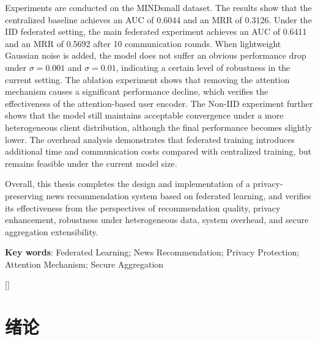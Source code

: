 \documentclass[UTF8,a4paper,12pt]{ctexart}
\numberwithin{equation}{section}
\renewcommand\thesection{\arabic{section}}
\begin{document}
Experiments are conducted on the MINDsmall dataset. The results show that the centralized baseline achieves an AUC of 0.6044 and an MRR of 0.3126. Under the IID federated setting, the main federated experiment achieves an AUC of 0.6411 and an MRR of 0.5692 after 10 communication rounds. When lightweight Gaussian noise is added, the model does not suffer an obvious performance drop under $\sigma=0.001$ and $\sigma=0.01$, indicating a certain level of robustness in the current setting. The ablation experiment shows that removing the attention mechanism causes a significant performance decline, which verifies the effectiveness of the attention-based user encoder. The Non-IID experiment further shows that the model still maintains acceptable convergence under a more heterogeneous client distribution, although the final performance becomes slightly lower. The overhead analysis demonstrates that federated training introduces additional time and communication costs compared with centralized training, but remains feasible under the current model size.

Overall, this thesis completes the design and implementation of a privacy-preserving news recommendation system based on federated learning, and verifies its effectiveness from the perspectives of recommendation quality, privacy enhancement, robustness under heterogeneous data, system overhead, and secure aggregation extensibility.

\vspace{1em}
\noindent\textbf{Key words}: Federated Learning; News Recommendation; Privacy Protection; Attention Mechanism; Secure Aggregation

\newpage
\titleformat{\section}{\heiti\zihao{3}\centering}{\thesection}{0.5em}{}[]
\renewcommand\contentsname{目\quad 录}

\begin{center}
\tableofcontents
\end{center}

\newpage
{}

\section{绪论}
\end{document}
